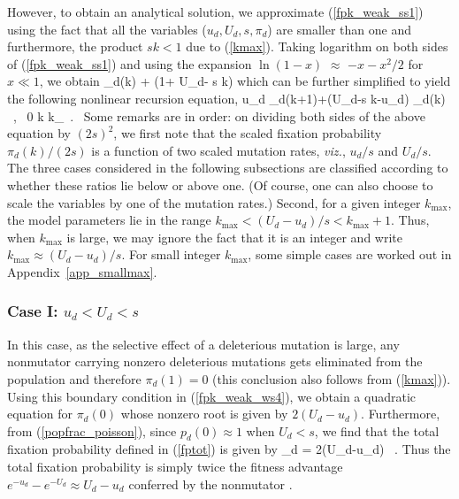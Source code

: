 \documentclass[preprint,12pt,number]{elsarticle}
\begin{document}
However, to obtain an analytical solution, we approximate (\ref{fpk_weak_ss1}) using the fact that all the variables ($u_d, U_d, s, \pi_d$) are smaller than one and furthermore, the product $s k < 1$ due to (\ref{kmax}).  
   Taking logarithm on both sides of (\ref{fpk_weak_ss1}) and using the expansion $\ln(1-x)$ $\approx$ $-x-x^2/2$ for $x \ll 1$,  we obtain 
\be
\pi_d(k) + \approx (1+ U_d- s k) \left[u_d \pi_d(k+1)+(1-u_d) \pi_d(k) \right] 
\ee
which can be further simplified to yield  the following nonlinear recursion equation, 
\be
\label{fpk_weak_ws4}
 \approx u_d \pi_d(k+1)+(U_d-s k-u_d) \pi_d(k) ~,~ 0 \leq k \leq k_{\max}~.~
\ee
Some remarks are in order: on dividing both sides of the above equation by $(2 s)^2$,  we first note that the scaled fixation probability $\pi_d(k)/(2 s)$ is a function of two scaled mutation rates, {\it viz.}, $u_d/s$ and $U_d/s$. 
The three cases considered in the following subsections are classified according to whether these ratios lie below or above one. (Of course, one can also choose to scale the variables by one of the mutation rates.) Second, for a given integer $k_{\max}$, the model parameters lie in the range $k_{\max} < (U_d-u_d)/s < k_{\max}+1$. Thus, when $k_{\max}$ is large, we may ignore the fact that it is an integer and write $k_{\max} \approx (U_d - u_d)/s$. 
For small integer $k_{\max}$, some simple cases are worked out in Appendix~\ref{app_smallmax}. 

\subsubsection {Case I: $u_d < U_d < s$}
\label{reg1}

In this case, as the selective effect of a deleterious mutation is large, any nonmutator carrying nonzero deleterious mutations gets eliminated from the population and therefore $\pi_d(1)=0$ (this conclusion also follows from (\ref{kmax})). Using this boundary condition in (\ref{fpk_weak_ws4}), we obtain a quadratic equation for $\pi_d(0)$  whose nonzero root  is given by $2(U_d-u_d)$. Furthermore, from (\ref{popfrac_poisson}), since $p_d(0) \approx 1$ when $U_d < s$,  we find that the total fixation probability defined in (\ref{fptot}) is given by  \citep{Lynch:2011,James:2016}
\be
\label{fptot_weak_ss}
\Pi_d = 2(U_d-u_d) ~.
\ee
Thus the total fixation probability is simply twice the fitness advantage $e^{-u_d}-e^{-U_d} \approx U_d-u_d$ conferred by the nonmutator \citep{Haldane:1927b,Lynch:2011,James:2016}. 
\end{document}
